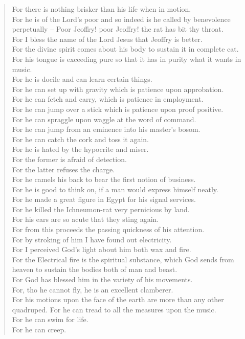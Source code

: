 \begin{verse}
  For there is nothing brisker than his life when in motion.\\
  For he is of the Lord's poor and so indeed is he called by benevolence perpetually -- Poor Jeoffry! poor Jeoffry! the rat has bit thy throat.\\
  For I bless the name of the Lord Jesus that Jeoffry is better.\\
  For the divine spirit comes about his body to sustain it in complete cat.\\
  For his tongue is exceeding pure so that it has in purity what it wants in music.\\
  For he is docile and can learn certain things.\\
  For he can set up with gravity which is patience upon approbation.\\
  For he can fetch and carry, which is patience in employment.\\
  For he can jump over a stick which is patience upon proof positive.\\
  For he can spraggle upon waggle at the word of command.\\
  For he can jump from an eminence into his master's bosom.\\
  For he can catch the cork and toss it again.\\
  For he is hated by the hypocrite and miser.\\
  For the former is afraid of detection.\\
  For the latter refuses the charge.\\
  For he camels his back to bear the first notion of business.\\
  For he is good to think on, if a man would express himself neatly.\\
  For he made a great figure in Egypt for his signal services.\\
  For he killed the Ichneumon-rat very pernicious by land.\\
  For his ears are so acute that they sting again.\\
  For from this proceeds the passing quickness of his attention.\\
  For by stroking of him I have found out electricity.\\
  For I perceived God's light about him both wax and fire.\\
  For the Electrical fire is the spiritual substance, which God sends from heaven to sustain the bodies both of man and beast.\\
  For God has blessed him in the variety of his movements.\\
  For, tho he cannot fly, he is an excellent clamberer.\\
  For his motions upon the face of the earth are more than any other quadruped.
  For he can tread to all the measures upon the music.\\
  For he can swim for life.\\
  For he can creep.
\end{verse}
